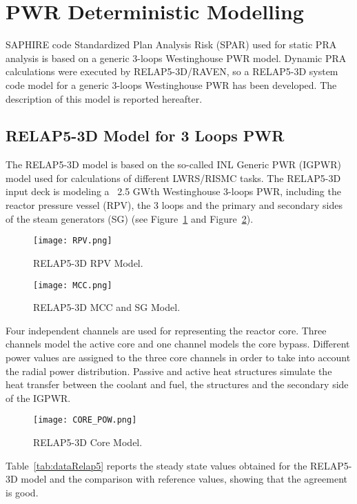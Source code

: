 \section{PWR Deterministic Modelling}
\label{sec:PWRdeterministicModeling}

SAPHIRE code Standardized Plan Analysis Risk (SPAR) used for static PRA analysis is based on a generic 3-loops Westinghouse PWR model. Dynamic PRA calculations were executed by RELAP5-3D/RAVEN, so a RELAP5-3D system code model for a generic 3-loops Westinghouse PWR has been developed. The description of this model is reported hereafter.


\subsection{RELAP5-3D Model for 3 Loops PWR}

The RELAP5-3D model is based on the so-called INL Generic PWR (IGPWR) model used for calculations of different LWRS/RISMC tasks. 
The RELAP5-3D input deck is modeling a ~2.5 GWth Westinghouse 3-loops PWR, including the reactor pressure vessel (RPV), the 3 loops and the primary and secondary sides of the steam generators (SG) (see Figure~\ref{fig:rpv} and Figure~\ref{fig:mcc}).  

\begin{figure}
    \centering
    \texttt{[image: RPV.png]}
    \caption{RELAP5-3D RPV Model.}
    \label{fig:rpv}
\end{figure} 

\begin{figure}
    \centering
    \texttt{[image: MCC.png]}
    \caption{RELAP5-3D MCC and SG Model.}
    \label{fig:mcc}
\end{figure} 

Four independent channels are used for representing the reactor core. Three channels model the active core and one channel models the core bypass. Different power values are assigned to the three core channels in order to take into account the radial power distribution. Passive and active heat structures simulate the heat transfer between the coolant and fuel, the structures and the secondary side of the IGPWR.

\begin{figure}
    \centering
    \texttt{[image: CORE\_POW.png]}
    \caption{RELAP5-3D Core Model.}
    \label{fig:CORE_POW}
\end{figure} 

Table~\ref{tab:dataRelap5} reports the steady state values obtained for the RELAP5-3D model and the comparison with reference values, showing that the agreement is good. 

